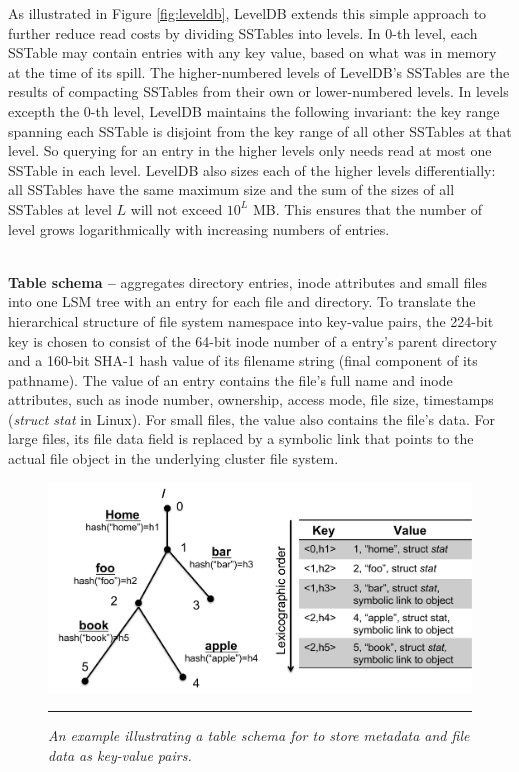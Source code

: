 As illustrated in Figure \ref{fig:leveldb},
LevelDB extends this simple approach to further
reduce read costs by dividing SSTables into levels.
In 0-th level, each SSTable may contain entries with any key value,
based on what was in memory at the time of its spill.
The higher-numbered levels of LevelDB's SSTables are
the results of compacting SSTables from their own or lower-numbered levels.
In levels excepth the 0-th level, LevelDB maintains the following invariant:
the key range spanning each SSTable is disjoint from
the key range of all other SSTables at that level.
So querying for an entry in the higher levels
only needs read at most one SSTable in each level.
LevelDB also sizes each of the higher levels differentially:
all SSTables have the same maximum size and
the sum of the sizes of all SSTables at level $L$ will not exceed $10^L$ MB.
This ensures that the number of level grows
logarithmically with increasing numbers of entries.

~\\
\textbf{Table schema -- }
\tfs aggregates directory entries,
inode attributes and small files into one LSM tree
with an entry for each file and directory.
To translate the hierarchical structure of file system namespace
into key-value pairs, the 224-bit key is chosen to consist of
the 64-bit inode number of a entry's parent directory
and a 160-bit SHA-1 hash value of its filename string
(final component of its pathname).
The value of an entry contains the file's full name and inode attributes,
such as inode number, ownership, access mode, file size, timestamps (\textit{struct stat} in Linux).
For small files, the value also contains the file's data.
For large files, its file data field is replaced by a symbolic link
that points to the actual file object in the underlying cluster file system.

\begin{figure}[t]
\centering
\includegraphics[scale=0.4]{figs/schema}
\vspace{10pt}
\caption{\textit{
An example illustrating a table schema for \tfs
to store metadata and file data as key-value pairs.}
}
\vspace{10pt}
\hrule
\label{fig:schema}
\end{figure}

